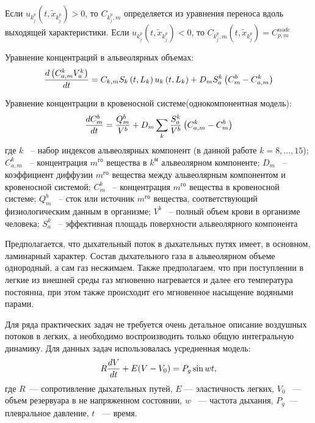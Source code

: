 Если $u_{k_{j}^{p} } \left(t,\tilde{x}_{k_{j}^{p} } \right)>0$, то $C_{k_{j}^{p} ,m} $ определяется из уравнения переноса вдоль выходящей характеристики. Если $u_{k_{j}^{p} } \left(t,\tilde{x}_{k_{j}^{p} } \right)<0$, то $ C_{k_{j}^{p} ,m} \left(t,\tilde{x}_{k_{j}^{p} } \right)=C_{p,m}^{node}$ 

Уравнение концентраций в альвеолярных объемах:
\begin{equation}  
\frac{d\left(C_{a,m}^{k} V_{a}^{k} \right)}{dt} =C_{k,m} S_{k} \left(t,L_{k} \right)u_{k} \left(t,L_{k} \right)+D_{m} S_{a}^{k} \left(C_{m}^{b} -C_{a,m}^{k} \right)\notag  
\end{equation} 


Уравнение концентрации в кровеносной системе(однокомпонентная модель):
\begin{equation} 
\frac{dC_{m}^{b} }{dt} =\frac{Q_{m}^{b} }{V^{b} } +D_{m} \sum _{k}\frac{S_{a}^{k} }{V^{b} } \left(C_{a,m}^{k} -C_{m}^{b} \right)\notag  
\end{equation}
где $k$ ~-- набор индексов альвеолярных компонент (в данной работе $k=8,...,15$); $C_{a,m}^{k} $ ~-- концентрация $m^{го} $  вещества в $k^{м} $ альвеолярном компоненте; $D_{m} $ ~-- коэффициент диффузии $m^{го} $ вещества между альвеолярным компонентом и кровеносной системой; $C_{m}^{b} $  ~-- концентрация $m^{го} $ вещества в кровеносной системе; $Q_{m}^{b} $ ~-- сток или источник $m^{го} $ вещества, соответствующий физиологическим данным в организме; $V^{b} $ ~-- полный объем крови в организме человека; $S_{a}^{k} $ ~-- эффективная площадь поверхности альвеолярного компонента

Предполагается, что дыхательный поток в дыхательных путях имеет, в основном, ламинарный характер. Состав дыхательного газа в альвеолярном объеме однородный, а сам газ несжимаем. Также предполагаем, что при поступлении в легкие из внешней среды газ мгновенно нагревается и далее его температура постоянна, при этом также происходит его мгновенное насыщение водяными парами. 

Для ряда практических задач не требуется очень детальное описание воздушных потоков в легких, а необходимо воспроизводить только общую интегральную динамику. Для данных задач использовалась усредненная модель: 
\begin{equation}\label{AlvEq}
R\frac{dV}{dt}+E(V-V_{0})=P_{g}\sin wt, \notag
\end{equation}
\noindent где \( R\)~--- сопротивление дыхательных путей, \( E\) --- эластичность легких, \( V_{0}\) ~--- объем резервуара в не напряженном состоянии, \( w\) ~--- частота дыхания, \( P_{g}\)~---плевральное давление, \( t\) ~--- время. 

